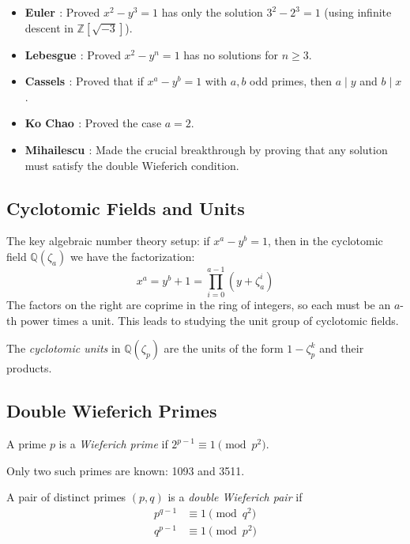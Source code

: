 \begin{itemize}
\item \textbf{Euler \cite{euler1783}}: Proved $x^2 - y^3 = 1$ has only the solution $3^2 - 2^3 = 1$ (using infinite descent in $\mathbb{Z}[\sqrt{-3}]$).
\item \textbf{Lebesgue \cite{lebesgue1850}}: Proved $x^2 - y^n = 1$ has no solutions for $n \geq 3$.
\item \textbf{Cassels \cite{cassels1960}}: Proved that if $x^a - y^b = 1$ with $a, b$ odd primes, then $a \mid y$ and $b \mid x$.
\item \textbf{Ko Chao \cite{kochao1965}}: Proved the case $a = 2$.
\item \textbf{Mihailescu \cite{mihailescu2004}}: Made the crucial breakthrough by proving that any solution must satisfy the double Wieferich condition.
\end{itemize}

\subsection{Cyclotomic Fields and Units}

The key algebraic number theory setup: if $x^a - y^b = 1$, then in the cyclotomic field $\mathbb{Q}(\zeta_a)$ we have the factorization:
\begin{equation}
x^a = y^b + 1 = \prod_{i=0}^{a-1} (y + \zeta_a^i)
\end{equation}
The factors on the right are coprime in the ring of integers, so each must be an $a$-th power times a unit. This leads to studying the unit group of cyclotomic fields.

\begin{definition}
The \emph{cyclotomic units} in $\mathbb{Q}(\zeta_p)$ are the units of the form $1 - \zeta_p^k$ and their products.
\end{definition}

\subsection{Double Wieferich Primes}

\begin{definition}
A prime $p$ is a \emph{Wieferich prime} if $2^{p-1} \equiv 1 \pmod{p^2}$.
\end{definition}

Only two such primes are known: 1093 and 3511.

\begin{definition}
A pair of distinct primes $(p, q)$ is a \emph{double Wieferich pair} if
\begin{align}
p^{q-1} &\equiv 1 \pmod{q^2} \\
q^{p-1} &\equiv 1 \pmod{p^2}
\end{align}
\end{definition}

